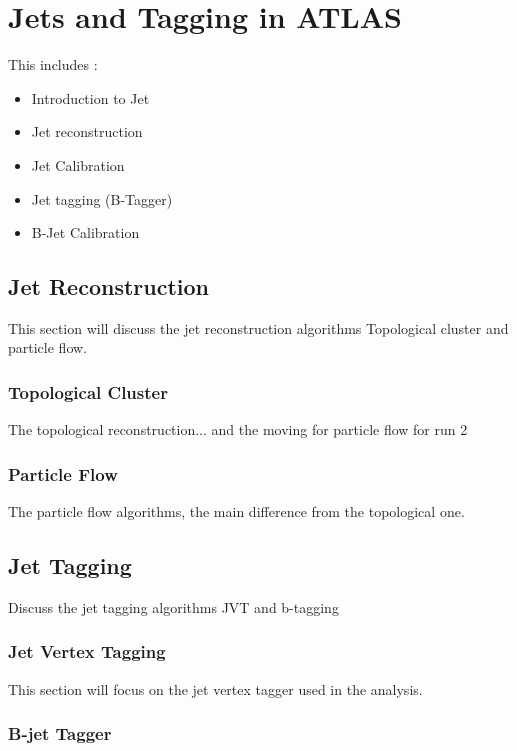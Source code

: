 \newpage
\chapter{Jets and Tagging in ATLAS}
\label{Jet}

This includes :
\begin{itemize}
    \item Introduction to Jet 
    \item Jet reconstruction
    \item Jet Calibration 
    \item Jet tagging (B-Tagger)
    \item B-Jet Calibration
\end{itemize}

\section{Jet Reconstruction}
\label{Jet:JR}

This section will discuss the jet reconstruction algorithms Topological cluster and particle flow.

\subsection{Topological Cluster}
\label{Jet:JR:Topo}

The topological reconstruction... and the moving for particle flow for run 2

\subsection{Particle Flow}
\label{Jet:JR:PF}

The particle flow algorithms, the main difference from the topological one. 

\section{Jet Tagging}
\label{Jet:Tag}

Discuss the jet tagging algorithms JVT and b-tagging 

\subsection{Jet Vertex Tagging}
\label{Jet:JVT}
This section will focus on the jet vertex tagger used in the analysis.

\subsection{B-jet Tagger}
\label{Jet:Dlr}

